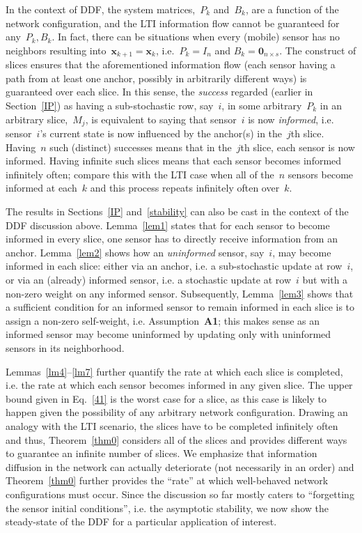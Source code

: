 \documentclass[draftclsnofoot, onecolumn, 12pt]{IEEEtran}
\def\mb{\mathbf}
\begin{document}
In the context of DDF, the system matrices,~$P_k$ and~$B_k$, are a function of the network configuration, and the LTI information flow cannot be guaranteed for any~$P_k,B_k$. In fact, there can be situations when every (mobile) sensor has no neighbors resulting into~$\mb{x}_{k+1}=\mb{x}_k$, i.e.~$P_k=I_n$ and $B_k=\mb{0}_{n\times s}$. The construct of slices ensures that the aforementioned information flow (each sensor having a path from at least one anchor, possibly in arbitrarily different ways) is guaranteed over each slice. In this sense, the \emph{success} regarded (earlier in Section~\ref{IP}) as having a sub-stochastic row, say~$i$, in some arbitrary~$P_k$ in an arbitrary slice,~$M_j$, is equivalent to saying that sensor~$i$ is now \emph{informed}, i.e. sensor~$i$'s current state is now influenced by the anchor(s) in the~$j$th slice. Having~$n$ such (distinct) successes means that in the~$j$th slice, each sensor is now informed. Having infinite such slices means that each sensor becomes informed infinitely often; compare this with the LTI case when all of the~$n$ sensors become informed at each~$k$ and this process repeats infinitely often over~$k$.

The results in Sections~\ref{IP} and~\ref{stability} can also be cast in the context of the DDF discussion above. Lemma~\ref{lem1} states that for each sensor to become informed in every slice, one sensor has to directly receive information from an anchor. Lemma~\ref{lem2} shows how an \emph{uninformed} sensor, say~$i$, may become informed in each slice: either via an anchor, i.e. a sub-stochastic update at row~$i$, or via an (already) informed sensor, i.e. a stochastic update at row~$i$ but with a non-zero weight on any informed sensor. Subsequently, Lemma~\ref{lem3} shows that a sufficient condition for an informed sensor to remain informed in each slice is to assign a non-zero self-weight, i.e. Assumption~{\bf A1}; this makes sense as an informed sensor may become uninformed by updating only with uninformed sensors in its neighborhood.

Lemmas~\ref{lm4}--\ref{lm7} further quantify the rate at which each slice is completed, i.e. the rate at which each sensor becomes informed in any given slice. The upper bound given in Eq.~\eqref{41} is the worst case for a slice, as this case is likely to happen given the possibility of any arbitrary network configuration. Drawing an analogy with the LTI scenario, the slices have to be completed infinitely often and thus, Theorem~\ref{thm0} considers all of the slices and provides different ways to guarantee an infinite number of slices. We emphasize that information diffusion in the network can actually deteriorate (not necessarily in an order) and Theorem~\ref{thm0} further provides the ``rate'' at which well-behaved network configurations must occur. Since the discussion so far mostly caters to ``forgetting the sensor initial conditions'', i.e. the asymptotic stability, we now show the steady-state of the DDF for a particular application of interest. 
\end{document}
